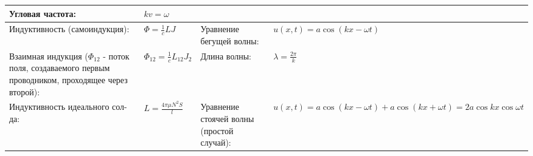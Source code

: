 \documentclass{article}
\begin{document}
\begin{tabular}{ |p{6cm}|p{3.5cm}|p{6cm}|p{3.5cm}|  }
Угловая частота:                                                           &
$k v=\omega$                                                               \\
\hline
Индуктивность (самоиндукция):                                              &
$\Phi=\frac{1}{c} L J$                                                     &
Уравнение бегущей волны:                                                   &
$u(x, t)=a \cos (k x-\omega t)$                                            \\
\hline
Взаимная индукция ($\Phi_{12}$ - поток поля, создаваемого первым проводником, проходящее через второй): &
$\Phi_{12}=\frac{1}{c} L_{12} J_{2}$                                       &
Длина волны:                                                               &
$\lambda=\frac{2 \pi}{k}$                                                  \\
\hline
Индуктивность идеального сол-да:                                           &
$L=\frac{4 \pi \mu N^{2} S}{l}$                                            &
Уравнение стоячей волны (простой случай):                                  &
$u(x, t)=a \cos (k x-\omega t)+a \cos (k x+\omega t)=2 a \cos k x \cos \omega t$\\
\hline
\end{tabular}

\newpage
\end{document}

